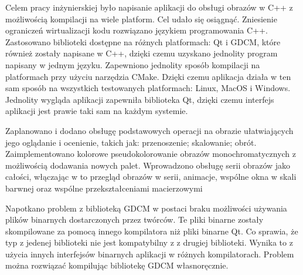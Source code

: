 \par
Celem pracy inżynierskiej było napisanie aplikacji do obsługi obrazów \DICOM w C++ z możliwością kompilacji na wiele platform.
Cel udało się osiągnąć.
Zniesienie ograniczeń wirtualizacji kodu rozwiązano językiem programowania C++.
Zastosowano biblioteki dostępne na różnych platformach: Qt i GDCM, które również zostały napisane w C++, dzięki czemu uzyskano jednolity program napisany w jednym języku.
Zapewniono jednolity sposób kompilacji na platformach przy użyciu narzędzia CMake.
Dzięki czemu aplikacja działa w ten sam sposób na wszystkich testowanych platformach: Linux, MacOS i Windows.
Jednolity wygląda aplikacji zapewniła biblioteka Qt, dzięki czemu interfejs aplikacji jest prawie taki sam na każdym systemie.
\par
Zaplanowano i dodano obsługę podstawowych operacji na obrazie ułatwiających jego oglądanie i ocenienie, takich jak: przenoszenie; skalowanie; obrót.
Zaimplementowano kolorowe pseudokolorowanie obrazów monochromatycznych z możliwością dodawania nowych palet.
Wprowadzono obsługę serii obrazów jako całości, włączając w to przegląd obrazów w serii, animacje, wspólne okna w skali barwnej oraz wspólne przekształceniami macierzowymi
\par
Napotkano problem z biblioteką GDCM w postaci braku możliwości używania plików binarnych dostarczonych przez twórców.
Te pliki binarne zostały skompilowane za pomocą innego kompilatora niż pliki binarne Qt.
Co sprawia, że typ  z jedenej biblioteki nie jest kompatybilny z  z drugiej biblioteki.
Wynika to z użycia innych interfejsów binarnych aplikacji  w różnych kompilatorach.
Problem można rozwiązać kompilując bibliotekę GDCM własnoręcznie.